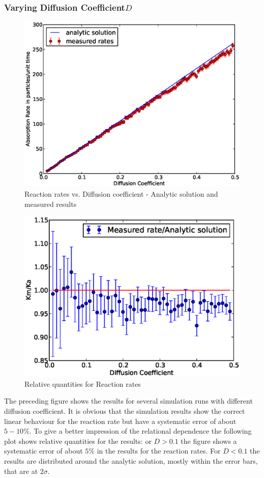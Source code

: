 \subsubsection{Varying Diffusion Coefficient$D$}
\begin{figure}[H]
    \centering
    \includegraphics[width=.85 \textwidth, keepaspectratio]{plots/np/d/Kabs.eps}
    \caption{Reaction rates vs. Diffusion coefficient - Analytic solution and measured results}
    \label{fig:Kabs_D}
\end{figure}
\begin{figure}
    \centering
    \includegraphics[width = .56 \textwidth, keepaspectratio]{plots/np/d/Krel.eps}
    \caption{Relative quantities for Reaction rates}
    \label{fig:Krel_d}
\end{figure}
The preceding figure shows the results for several simulation runs with different diffusion coefficient. It is obvious that the simulation results show the correct linear behaviour for the reaction rate but have a systematic error of about $5 - 10 \%$. To give a better impression of the relational dependence the following plot shows relative quantities for the results:
or $D > 0.1$ the figure shows a systematic error of about $5 \%$ in the results for the reaction rates. For $D<0.1$ the results are distributed around the analytic solution, mostly within the error bars, that are at  $2\sigma$. 
\newpage
